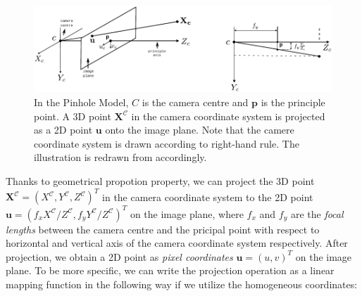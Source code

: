 \documentclass[a4paper]{report}
\numberwithin{figure}{section}
\begin{document}
\begin{figure}[H]
	\centering
	\includegraphics[width=\linewidth,natwidth=640,natheight=640]
  {fig/drawings/pinhole_3d2d.pdf}
  \caption[The Pinhole Model]{In the Pinhole Model, $C$ is the camera centre 
  and $\mathbf{p}$ is the principle point. A 3D point 
  $\mathbf{X^{\mathcal{C}}}$ in the 
  camera coordinate system is projected as a 2D point $\mathbf{u}$ onto the 
  image plane. Note that the camere coordinate system is drawn according to 
  right-hand rule. The illustration is redrawn from 
  \parencite{RichardHartley2003} 
  accordingly.}
	\label{fig:pinhole}
\end{figure}

Thanks to geometrical propotion property, we can project the 3D point 
$\mathbf{X^{\mathcal{C}}}=(X^{\mathcal{C}}, Y^{\mathcal{C}}, 
Z^{\mathcal{C}})^T$ in the 
camera 
coordinate system 
to 
the 2D 
point $\mathbf{u} = (f_xX^{\mathcal{C}}/Z^{\mathcal{C}}, 
f_yY^{\mathcal{C}}/Z^{\mathcal{C}})^T$ on the 
image 
plane, where 
$f_x$ and $f_y$ are the \textit{focal lengths} between the camera centre and 
the pricipal point with respect to horizontal and vertical axis of the camera 
coordinate system respectively.  After projection, we obtain a 2D point  
as \textit{pixel coordinates} $\mathbf{u}=(u,v)^T$ on the image plane.  To 
be more specific, we can write the projection operation as a linear mapping 
function in the following way if we utilize the homogeneous coordinates:
\end{document}
